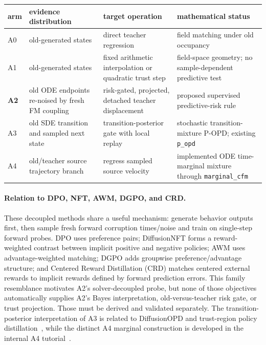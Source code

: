 \documentclass[11pt,a4paper]{article}
\theoremstyle{plain}
\theoremstyle{definition}
\begin{document}
\begin{center}
\small
\begin{tabular}{@{}
  >{\raggedright\arraybackslash}p{}
  >{\raggedright\arraybackslash}p{}
  >{\raggedright\arraybackslash}p{}
  >{\raggedright\arraybackslash}p{}@{}}
\toprule
arm & evidence distribution & target operation & mathematical status\\
\midrule
A0 & old-generated states & direct teacher regression & field matching under old occupancy\\
\addlinespace
A1 & old-generated states & fixed arithmetic interpolation or quadratic trust step &
field-space geometry; no sample-dependent predictive test\\
\addlinespace
\textbf{A2} & old ODE endpoints re-noised by fresh FM coupling & risk-gated, projected,
detached teacher displacement & proposed supervised predictive-risk rule\\
\addlinespace
A3 & old SDE transition and sampled next state & transition-posterior gate with local replay &
stochastic transition-mixture P-OPD; existing \texttt{p\_opd}\\
\addlinespace
A4 & old/teacher source trajectory branch & regress sampled source velocity &
implemented ODE time-marginal mixture through \texttt{marginal\_cfm}\\
\bottomrule
\end{tabular}
\end{center}

\paragraph{Relation to DPO, NFT, AWM, DGPO, and CRD.}
These decoupled methods share a useful mechanism: generate behavior outputs first, then sample
fresh forward corruption times/noise and train on single-step forward probes.  DPO uses
preference pairs; DiffusionNFT forms a reward-weighted contrast between implicit positive and
negative policies; AWM uses advantage-weighted matching; DGPO adds groupwise
preference/advantage structure; and Centered Reward Distillation (CRD) matches centered external
rewards to implicit rewards defined by forward prediction errors.  This family resemblance
motivates A2's solver-decoupled probe, but none of those objectives automatically supplies A2's
Bayes interpretation, old-versus-teacher risk gate, or trust projection.  Those must be derived
and validated separately.
The transition-posterior interpretation of A3 is related to DiffusionOPD and trust-region policy
distillation~\cite{diffusionopd,topd}, while the distinct A4 marginal construction is developed in
the internal A4 tutorial~\cite{internal-a4}.
\end{document}
